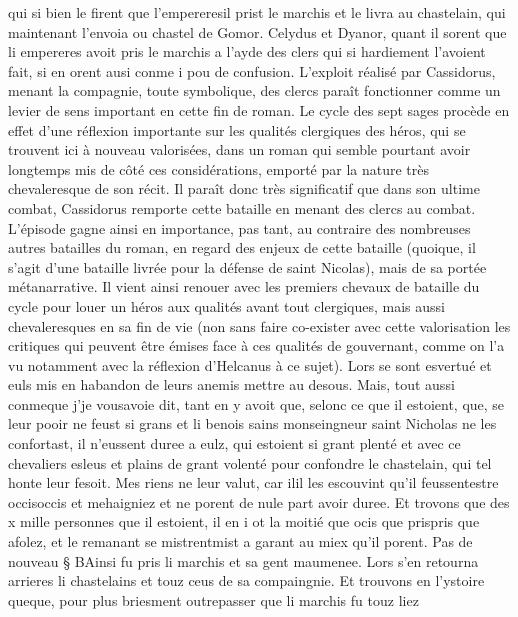 \documentclass{article}
\begin{document}
\begin{pages}
   qui si bien le firent que 
   l’empereresil 
   prist le marchis
   et le livra au chastelain, qui maintenant l’envoia ou 
   chastel de Gomor. \pend
\pstart Celydus et Dyanor, 
   quant il sorent que li empereres avoit pris 
   le marchis a l’ayde des clers 
   qui si hardiement l’avoient fait, si en orent ausi conme i pou de 
   confusion. L'exploit réalisé par Cassidorus, menant la compagnie, toute symbolique, des clercs 
   paraît fonctionner comme un levier de sens important en cette fin de roman. Le cycle des sept sages procède en effet d'une réflexion
   importante sur les qualités clergiques des héros, qui se trouvent ici à nouveau valorisées, dans un roman qui semble pourtant 
   avoir longtemps mis de côté ces considérations, emporté par la nature très chevaleresque de son récit. Il paraît donc très 
   significatif que dans son ultime combat, Cassidorus remporte cette bataille en menant des clercs au combat. 
   L'épisode gagne ainsi en importance, pas tant, au contraire des nombreuses autres batailles du roman, en regard des enjeux de cette 
   bataille (quoique, il s'agit d'une bataille livrée pour la défense de saint Nicolas), mais de sa portée métanarrative.
   Il vient ainsi renouer avec les premiers chevaux de bataille du cycle pour louer un héros aux qualités avant tout clergiques,
   mais aussi chevaleresques en sa fin de vie (non sans faire co-exister avec cette valorisation les critiques qui peuvent être émises 
   face à ces qualités de gouvernant, comme on l'a vu notamment avec la réflexion d'Helcanus à ce sujet). 
   Lors se sont esvertué et euls mis en habandon de leurs anemis mettre au desous. Mais, tout aussi 
   conmeque 
      j’je vousavoie dit, tant en y avoit que, selonc ce que il estoient, 
   que, se leur pooir ne feust si grans et li benois sains monseingneur 
      saint Nicholas 
   ne les confortast, il n’eussent duree a eulz, qui estoient si grant plenté et avec ce chevaliers esleus et plains de grant volenté 
   pour confondre le chastelain, qui tel honte leur fesoit. Mes riens ne leur valut, 
   car ilil les 
   escouvint qu’il feussentestre 
   occisoccis et mehaigniez 
   et ne porent de nule part avoir duree. Et trovons que des x mille personnes que il estoient, il en i ot la moitié que ocis 
   que prispris que afolez, et le remanant se 
   mistrentmist a garant au miex qu’il porent. \pend
\pstart Pas de nouveau § BAinsi fu pris 
   li marchis et sa gent maumenee. 
   Lors s’en retourna arrieres li chastelains et touz ceus de sa compaingnie. 
   Et trouvons en l’ystoire queque, pour plus briesment
   outrepasser que li marchis fu touz liez 

\end{pages}
\end{document}
